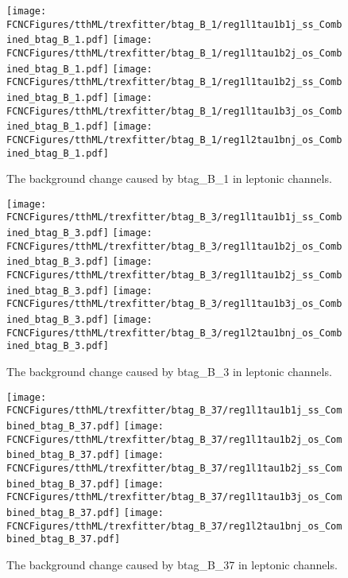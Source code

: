 \begin{figure}[H]
\centering
\texttt{[image: \\FCNCFigures/tthML/trexfitter/btag\_B\_1/reg1l1tau1b1j\_ss\_Combined\_btag\_B\_1.pdf]}
\texttt{[image: \\FCNCFigures/tthML/trexfitter/btag\_B\_1/reg1l1tau1b2j\_os\_Combined\_btag\_B\_1.pdf]}
\texttt{[image: \\FCNCFigures/tthML/trexfitter/btag\_B\_1/reg1l1tau1b2j\_ss\_Combined\_btag\_B\_1.pdf]}
\texttt{[image: \\FCNCFigures/tthML/trexfitter/btag\_B\_1/reg1l1tau1b3j\_os\_Combined\_btag\_B\_1.pdf]}
\texttt{[image: \\FCNCFigures/tthML/trexfitter/btag\_B\_1/reg1l2tau1bnj\_os\_Combined\_btag\_B\_1.pdf]}
\caption{The background change caused by btag\_B\_1 in leptonic channels.}
\label{fig:tthML_btag_B_1}
\end{figure}

\begin{figure}[H]
\centering
\texttt{[image: \\FCNCFigures/tthML/trexfitter/btag\_B\_3/reg1l1tau1b1j\_ss\_Combined\_btag\_B\_3.pdf]}
\texttt{[image: \\FCNCFigures/tthML/trexfitter/btag\_B\_3/reg1l1tau1b2j\_os\_Combined\_btag\_B\_3.pdf]}
\texttt{[image: \\FCNCFigures/tthML/trexfitter/btag\_B\_3/reg1l1tau1b2j\_ss\_Combined\_btag\_B\_3.pdf]}
\texttt{[image: \\FCNCFigures/tthML/trexfitter/btag\_B\_3/reg1l1tau1b3j\_os\_Combined\_btag\_B\_3.pdf]}
\texttt{[image: \\FCNCFigures/tthML/trexfitter/btag\_B\_3/reg1l2tau1bnj\_os\_Combined\_btag\_B\_3.pdf]}
\caption{The background change caused by btag\_B\_3 in leptonic channels.}
\label{fig:tthML_btag_B_3}
\end{figure}

\begin{figure}[H]
\centering
\texttt{[image: \\FCNCFigures/tthML/trexfitter/btag\_B\_37/reg1l1tau1b1j\_ss\_Combined\_btag\_B\_37.pdf]}
\texttt{[image: \\FCNCFigures/tthML/trexfitter/btag\_B\_37/reg1l1tau1b2j\_os\_Combined\_btag\_B\_37.pdf]}
\texttt{[image: \\FCNCFigures/tthML/trexfitter/btag\_B\_37/reg1l1tau1b2j\_ss\_Combined\_btag\_B\_37.pdf]}
\texttt{[image: \\FCNCFigures/tthML/trexfitter/btag\_B\_37/reg1l1tau1b3j\_os\_Combined\_btag\_B\_37.pdf]}
\texttt{[image: \\FCNCFigures/tthML/trexfitter/btag\_B\_37/reg1l2tau1bnj\_os\_Combined\_btag\_B\_37.pdf]}
\caption{The background change caused by btag\_B\_37 in leptonic channels.}
\label{fig:tthML_btag_B_37}
\end{figure}

